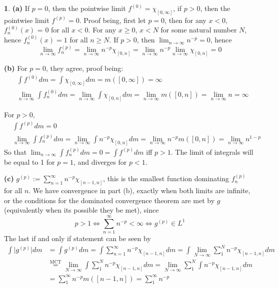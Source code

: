 \documentclass[10.5pt]{article}
\theoremstyle{definition}
\newtheorem{pb}{}
\newcommand{\abs}[1]{\lvert#1\rvert}
\begin{document}
\begin{pb}
    \textbf{(a)} If \(p = 0\), then the pointwise limit \(f^{(0)} = \chi_{[0,\infty]}\), if \(p > 0\), then the pointwise limit \(f^{(p)} = 0\). Proof being, first
    let \(p = 0\), then for any \(x < 0\), \(f^{(0)}_n(x)\) = 0 for all \(x < 0\). For any \(x \geq 0\), \(x < N\) for some natural number \(N\), hence
    \(f^{(0)}_n(x) = 1\) for all \(n \geq N\). If \(p > 0\), then \(\lim_{n\to\infty}n^{-p} = 0\), 
    hence \[\lim_{n\to\infty}f^{(p)}_n = \lim_{n\to\infty}n^{-p}\chi_{[0,n]} = \lim_{n\to\infty}n^{-p}\lim_{n\to\infty}\chi_{[0,n]} = 0\]

    \textbf{(b)} For \(p = 0\), they agree, proof being:
    \begin{align*}
        &\int f^{(0)}dm = \int \chi_{[0,\infty]}dm = m([0,\infty]) = \infty \\
        &\lim_{n\to\infty}\int f^{(0)}_n dm = \lim_{n\to\infty}\int \chi_{[0,n]}dm = \lim_{n\to\infty} m([0,n]) = \lim_{n\to\infty} n = \infty
    \end{align*}

    For \(p > 0\),
    \begin{align*}
        &\int f^{(p)}dm = 0 \\
        &\lim_{n\to\infty}\int f^{(p)}_n dm = \lim_{n\to\infty}\int n^{-p}\chi_{[0,n]}dm = \lim_{n\to\infty} n^{-p}m([0,n]) = \lim_{n\to\infty} n^{1-p}
    \end{align*}
    So that \(\lim_{n\to\infty}\int f^{(p)}_n dm = 0 = \int f^{(p)}dm\) iff \(p > 1\). The limit of integrals will be equal to 1 for \(p=1\), and diverges for \(p<1\).

    \textbf{(c)} \(g^{(p)} := \sum_{n=1}^\infty n^{-p}\chi_{[n-1,n]}\), this is the smallest function dominating \(f^{(p)}_n\) for all \(n\). 
    We have convergence in part (b), exactly when both limits are infinite, or the
    conditions for the dominated convergence theorem are met by \(g\) (equivalently when its possible they be met), since 
    \[p > 1 \iff \sum_{n=1}^\infty n^{-p} < \infty \iff g^{(p)} \in L^1\]
    The last if and only if statement can be seen by
    \begin{align*}
        \int \abs{g^{(p)}} dm &= \int g^{(p)}dm = \int \sum_{n=1}^\infty n^{-p}\chi_{[n-1,n]} dm = \int \lim_{N\to\infty}\sum_1^N n^{-p}\chi_{[n-1,n]} dm \\
        &\overset{\text{MCT}}{=} \lim_{N\to\infty} \int \sum_1^N n^{-p}\chi_{[n-1,n]} dm = \lim_{N\to\infty} \sum_1^N \int n^{-p}\chi_{[n-1,n]} dm \\
        &= \sum_1^\infty n^{-p} m([n-1,n]) = \sum_1^\infty n^{-p}
    \end{align*}
\end{pb}
\end{document}
